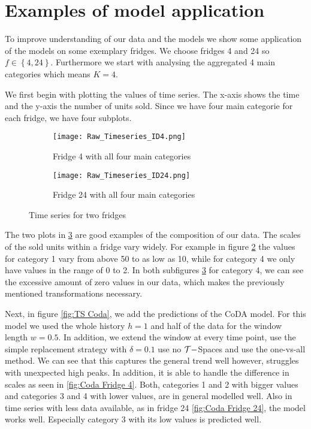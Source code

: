 \section{Examples of model application}
\label{sec:Examples of model applicatio}

To improve understanding of our data and the models we show some application of the models on some exemplary fridges. We choose fridges 4 and 24 so $f \in \left\{4,24\right\}$. Furthermore we start with analysing the aggregated 4 main categories which means $K=4$. 

We first begin with plotting the values of time series. The x-axis shows the time and the y-axis the number of units sold. Since we have four main categorie for each fridge, we have four subplots. 

\begin{figure}[htb]
\centering
\begin{subfigure}[b]{0.45\textwidth}
\texttt{[image: Raw\_Timeseries\_ID4.png]} 
\caption{Fridge 4 with all four main categories}
\label{fig:TS Fridge 4}
\end{subfigure}
\hfill
\begin{subfigure}[b]{0.45\textwidth}
\texttt{[image: Raw\_Timeseries\_ID24.png]} 
\caption{Fridge 24 with all four main categories}
\label{fig:TS Fridge 24}
\end{subfigure}
\caption{Time series for two fridges}
\label{fig:TS raw}
\end{figure}


The two plots in \ref{fig:TS raw} are good examples of the composition of our data. The scales of the sold units within a fridge vary widely. For example in figure \ref{fig:TS Fridge 24} the values for category 1 vary from above 50 to as low as 10, while for category 4 we only have values in the range of 0 to 2. In both subfigures \ref{fig:TS raw} for category 4, we can see the excessive amount of zero values in our data, which makes the previously mentioned transformations necessary. 

Next, in figure \ref{fig:TS Coda}, we add the predictions of the CoDA model. For this model we used the whole history $h=1$ and half of the data for the window length $w=0.5$. In addition, we extend the window at every time point, use the simple replacement strategy with $\delta=0.1$ use no $\mathcal{T}-$Spaces and use the one-vs-all method. We can see that this captures the general trend well however, struggles with unexpected high peaks. In addition, it is able to handle the difference in scales as seen in \ref{fig:Coda Fridge 4}. Both, categories 1 and 2 with bigger values and categories 3 and 4 with lower values, are in general modelled well. Also in time series with less data available, as in fridge 24 \ref{fig:Coda Fridge 24}, the model works well. Especially category 3 with its low values is predicted well. 


